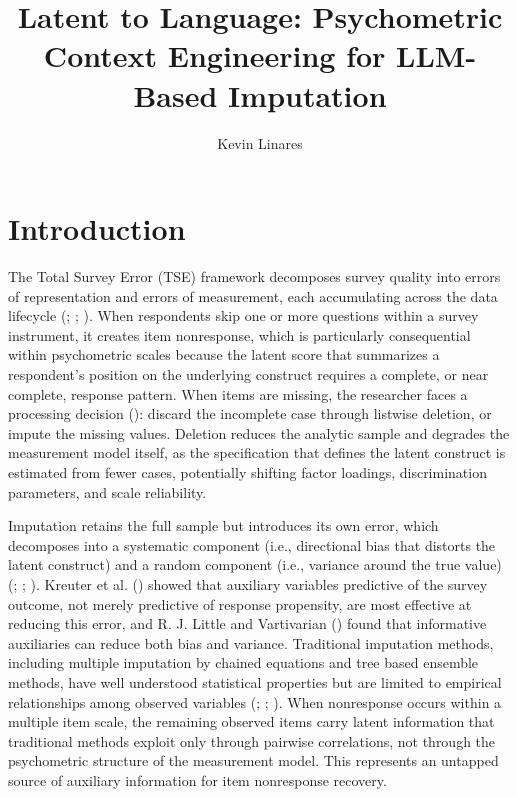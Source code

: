 \documentclass[
  man,
  floatsintext,
  longtable,
  nolmodern,
  notxfonts,
  notimes,
  colorlinks=true,linkcolor=blue,citecolor=blue,urlcolor=blue]{apa7}
\title{Latent to Language: Psychometric Context Engineering for
LLM-Based Imputation}
\author{Kevin Linares}
\affiliation{
{Joint Program in Survey Methodology, University of Maryland}}
\begin{document}
\maketitle




\setlength\LTleft{0pt}




\section{Introduction}\label{sec-intro}

The Total Survey Error (TSE) framework decomposes survey quality into
errors of representation and errors of measurement, each accumulating
across the data lifecycle (; ;
). When respondents
skip one or more questions within a survey instrument, it creates item
nonresponse, which is particularly consequential within psychometric
scales because the latent score that summarizes a respondent's position
on the underlying construct requires a complete, or near complete,
response pattern. When items are missing, the researcher faces a
processing decision (): discard
the incomplete case through listwise deletion, or impute the missing
values. Deletion reduces the analytic sample and degrades the
measurement model itself, as the specification that defines the latent
construct is estimated from fewer cases, potentially shifting factor
loadings, discrimination parameters, and scale reliability.

Imputation retains the full sample but introduces its own error, which
decomposes into a systematic component (i.e., directional bias that
distorts the latent construct) and a random component (i.e., variance
around the true value) (;
;
). Kreuter et al.
() showed that auxiliary variables
predictive of the survey outcome, not merely predictive of response
propensity, are most effective at reducing this error, and R. J. Little
and Vartivarian () found that informative
auxiliaries can reduce both bias and variance. Traditional imputation
methods, including multiple imputation by chained equations and tree
based ensemble methods, have well understood statistical properties but
are limited to empirical relationships among observed variables
(;
;
). When nonresponse occurs within a
multiple item scale, the remaining observed items carry latent
information that traditional methods exploit only through pairwise
correlations, not through the psychometric structure of the measurement
model. This represents an untapped source of auxiliary information for
item nonresponse recovery.
\end{document}
